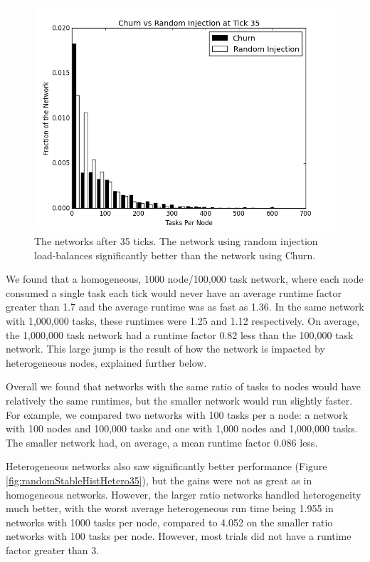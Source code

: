 \documentclass[10pt,conference]{IEEEtran}
\begin{document}
	\begin{figure}
		\centering
		\includegraphics[width=0.9\linewidth]{figs/churnInjectionHist35}
		\caption[Churn vs Random Injection after 35 ticks.]{The networks after 35 ticks.  The network using random injection load-balances significantly better than the network using Churn.}
		\label{fig:churnInjectionHist35}
	\end{figure}
	
	We found that a homogeneous, 1000 node/100,000 task network, where each node consumed a single task each tick would never have an average runtime factor greater than 1.7 and the average runtime was as fast as 1.36.
	In the same network with 1,000,000 tasks, these runtimes were 1.25 and 1.12 respectively.
	On average, the 1,000,000 task network had a runtime factor 0.82 less than the 100,000 task network.
	This large jump is the result of how the network is impacted by heterogeneous nodes, explained further below.
	
	Overall we found that networks with the same ratio of tasks to nodes would have relatively the same runtimes, but the smaller network would run slightly faster.
	For example, we compared two networks with 100 tasks per a node: a network with 100 nodes and 100,000 tasks and one with 1,000 nodes and 1,000,000 tasks.
	The smaller network had, on average, a mean runtime factor 0.086 less.
	
	Heterogeneous networks also saw significantly better performance (Figure \ref{fig:randomStableHistHetero35}), but the gains were not as great as in homogeneous networks.
	However, the larger ratio networks handled heterogeneity much better, with the worst average heterogeneous run time being 1.955 in networks with 1000 tasks per node, compared to 4.052 on the smaller ratio networks with 100 tasks per node.
	However, most trials did not have a runtime factor greater than 3.
	
\end{document}
